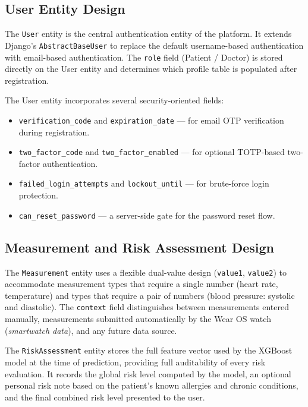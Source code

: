 \subsection{User Entity Design}

The \texttt{User} entity is the central authentication entity of the platform. It extends Django's \texttt{AbstractBaseUser} to replace the default username-based authentication with email-based authentication. The \texttt{role} field (Patient / Doctor) is stored directly on the User entity and determines which profile table is populated after registration.

The User entity incorporates several security-oriented fields:
\begin{itemize}
    \item \texttt{verification\_code} and \texttt{expiration\_date} — for email OTP verification during registration.
    \item \texttt{two\_factor\_code} and \texttt{two\_factor\_enabled} — for optional TOTP-based two-factor authentication.
    \item \texttt{failed\_login\_attempts} and \texttt{lockout\_until} — for brute-force login protection.
    \item \texttt{can\_reset\_password} — a server-side gate for the password reset flow.
\end{itemize}

\subsection{Measurement and Risk Assessment Design}

The \texttt{Measurement} entity uses a flexible dual-value design (\texttt{value1}, \texttt{value2}) to accommodate measurement types that require a single number (heart rate, temperature) and types that require a pair of numbers (blood pressure: systolic and diastolic). The \texttt{context} field distinguishes between measurements entered manually, measurements submitted automatically by the Wear OS watch (\textit{smartwatch data}), and any future data source.

The \texttt{RiskAssessment} entity stores the full feature vector used by the XGBoost model at the time of prediction, providing full auditability of every risk evaluation. It records the global risk level computed by the model, an optional personal risk note based on the patient's known allergies and chronic conditions, and the final combined risk level presented to the user.

